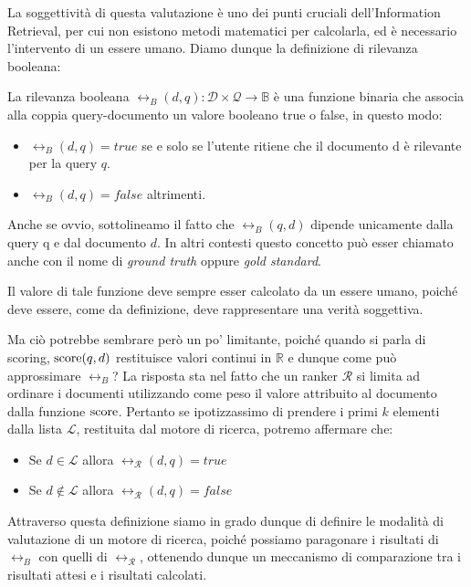 La soggettività di questa valutazione è uno dei punti cruciali dell'Information Retrieval, per cui non esistono
metodi matematici per calcolarla, ed è necessario l'intervento di un essere umano.
Diamo dunque la definizione di rilevanza booleana:

\begin{definizione}\label{def:relb}
	La rilevanza booleana $\rel_B(d,q): \mathcal{D} \times \mathcal{Q} \rightarrow \mathbb{B}$
	è una funzione binaria che associa alla coppia query-documento un valore booleano
	true o false, in questo modo:
	\begin{itemize}
		\item		$\rel_B(d,q) = true$ se e solo se l'utente ritiene che il documento d è rilevante
							per la query $q$.
		\item $\rel_B(d,q) = false$ altrimenti.
	\end{itemize}
	
	Anche se ovvio, sottolineamo il fatto che $\rel_B(q,d)$ dipende unicamente dalla query q e
	dal documento $d$. In altri contesti questo concetto può esser chiamato anche con il nome
	di \textit{ground truth} oppure \textit{gold standard}.
\end{definizione}

Il valore di tale funzione deve sempre esser calcolato da un essere umano, poiché
deve essere, come da definizione, deve rappresentare una verità soggettiva.

Ma ciò potrebbe sembrare però un po' limitante, poiché quando si parla di scoring,
$\text{score}(q,d)$ restituisce valori continui in $\mathbb{R}$ e dunque come può
approssimare $\rel_B$?
La risposta sta nel fatto che un ranker $\mathcal{R}$ si limita ad ordinare i documenti utilizzando come peso
il valore attribuito al documento dalla funzione $\text{score}$. Pertanto se ipotizzassimo di prendere
i primi $k$ elementi dalla lista $\mathcal{L}$, restituita dal motore di ricerca, potremo affermare che:

\begin{itemize}
	\item Se $d \in \mathcal{L}$  allora $\rel_{\mathcal{R}}(d, q) = true$
	\item Se $d \notin \mathcal{L}$ allora $\rel_{\mathcal{R}}(d,q) = false$
\end{itemize}

Attraverso questa definizione siamo in grado dunque di definire le modalità di valutazione di
un motore di ricerca, poiché possiamo paragonare i risultati di $\rel_B$ con quelli di $\rel_{\mathcal{R}}$,
ottenendo dunque un meccanismo di comparazione tra i risultati attesi e i risultati calcolati.

